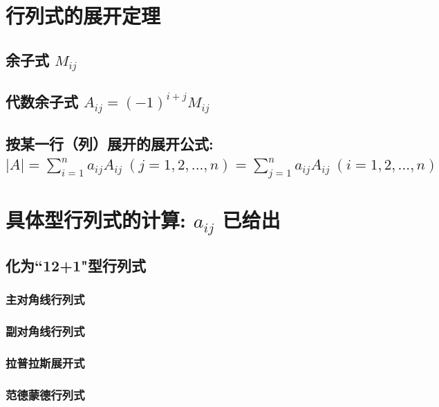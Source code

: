 \documentclass[UTF8]{ctexart}
\begin{document}
	
	\section{行列式的展开定理}
	
	\subsection{余子式 $M_{ij}$}
	
	\subsection{代数余子式 $	A_{ij}=\left( -1 \right) ^{i+j}M_{ij}$}
	
	\subsection{按某一行（列）展开的展开公式: \\ $|A|=\sum_{i=1}^n{a_{ij}A_{ij}\ \left( j=1,2,...,n \right)}=\sum_{j=1}^n{a_{ij}A_{ij}\ \left( i=1,2,...,n \right)}$	}
	
	
	
	\section{具体型行列式的计算: $a_{ij}$ 已给出}
	
	\subsection{化为``12+1"型行列式}
	
		\subsubsection{主对角线行列式}
		
		\subsubsection{副对角线行列式}
		
		\subsubsection{拉普拉斯展开式}
		
		\subsubsection{范德蒙德行列式}
	
\end{document}
